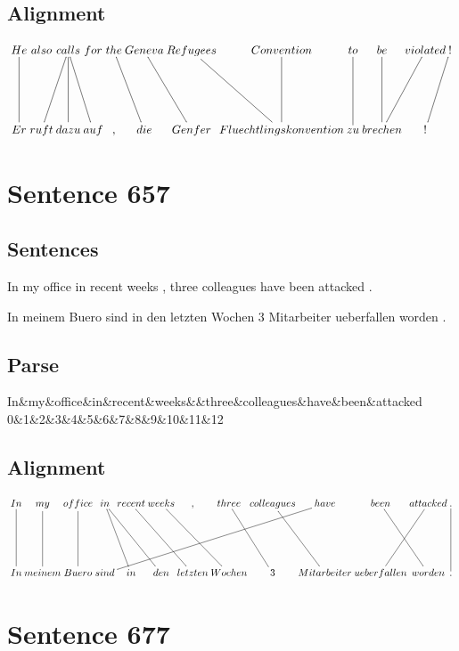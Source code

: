 \documentclass{report}
\begin{document}
\subsection*{Alignment}
\scriptsize{
$
\xymatrix@C-2.3pc{
He \ar @{-} [dd] & also & calls \ar @{-} [ddl] \ar @{-} [ddr] \ar @{-} [dd] & for & the \ar @{-} [ddr] & Geneva \ar @{-} [ddr] & Refugees \ar @{-} [ddr] & Convention \ar @{-} [dd] & to \ar @{-} [dd] & be \ar @{-} [dd] & violated \ar @{-} [ddl] & ! \ar @{-} [ddl]\\\\
Er & ruft & dazu & auf & , & die & Genfer & Fluechtlingskonvention & zu & brechen & !
}$}
\newpage\section*{Sentence 657}

\subsection*{Sentences}
In my office in recent weeks , three colleagues have been attacked .

\noindent In meinem Buero sind in den letzten Wochen 3 Mitarbeiter ueberfallen worden .



\subsection*{Parse}
\begin{dependency}[theme=simple]
\begin{deptext}[column sep=.5cm, row sep=.1ex]
In\&my\&office\&in\&recent\&weeks\&\&three\&colleagues\&have\&been\&attacked\\
0\&1\&2\&3\&4\&5\&6\&7\&8\&9\&10\&11\&12\\
\end{deptext}
\end{dependency}


\subsection*{Alignment}
\scriptsize{
$
\xymatrix@C-2.3pc{
In \ar @{-} [dd] & my \ar @{-} [dd] & office \ar @{-} [dd] & in \ar @{-} [ddr] \ar @{-} [ddrr] & recent \ar @{-} [ddrr] & weeks \ar @{-} [ddrr] & , & three \ar @{-} [ddr] & colleagues \ar @{-} [ddr] & have \ar @{-} [ddllllll] & been \ar @{-} [ddr] & attacked \ar @{-} [ddl] & . \ar @{-} [dd]\\\\
In & meinem & Buero & sind & in & den & letzten & Wochen & 3 & Mitarbeiter & ueberfallen & worden & .
}$}
\newpage\section*{Sentence 677}
\end{document}
